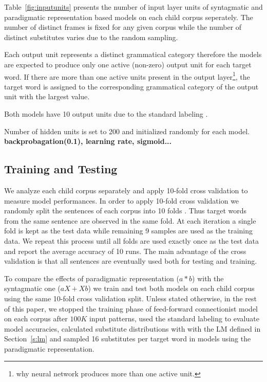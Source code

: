 Table~\ref{fig:inputunits} presents the number of input layer units of
syntagmatic and paradigmatic representation based models on each child
corpus seperately.  The number of distinct frames is fixed for any
given corpus while the number of distinct substitutes varies due to
the random sampling.

Each output unit represents a distinct grammatical category therefore the
models are expected to produce only one active (non-zero) output unit for each
target word.  If there are more than one active units present in the output
layer\footnote{why neural network produces more than one active unit.}, the
target word is assigned to the corresponding grammatical category of the output
unit with the largest value.

Both models have 10 output units due to the standard labeling
\citep*{Mintz200391}.

Number of hidden units is set to 200 and initialized randomly for each
model. {\bf backprobagation(0.1), learning rate, sigmoid...}

\subsection{Training and Testing}


We analyze each child corpus separately and apply 10-fold cross validation to
measure model performances.  In order to apply 10-fold cross validation we
randomly split the sentences of each corpus into 10 folds .  Thus target words
from the same sentence are observed in the same fold.  At each iteration a
single fold is kept as the test data while remaining 9 samples are used as the
training data.  We repeat this process until all folds are used exactly once as
the test data and report the average accuracy of 10 runs.  The main advantage
of the cross validation is that all sentences are eventually used both for
testing and training.

To compare the effects of paradigmatic representation ($a*b$) with the
syntagmatic one ($aX+Xb$) we train and test both models on each child corpus
using the same 10-fold cross validation split.  Unless stated otherwise, in the
rest of this paper, we stopped the training phase of feed-forward connectionist
model on each corpus after $100K$ input patterns, used the standard labeling to
evaluate model accuracies, calculated substitute distributions with with the LM
defined in Section~\ref{s:lm} and sampled 16 substitutes per target word in
models using the paradigmatic representation.

